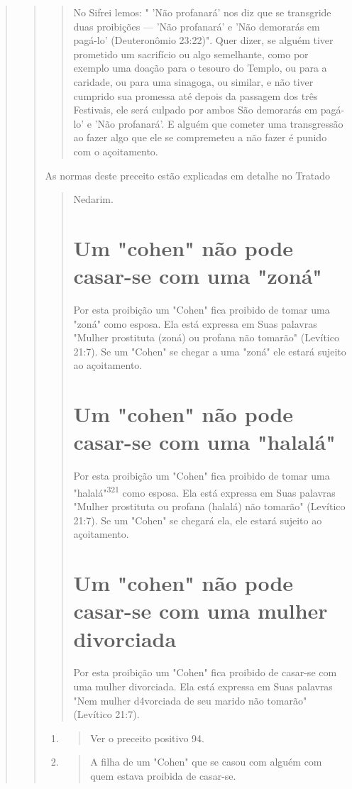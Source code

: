 \begin{quote}
\begin{quote}
\begin{quote}
No Sifrei lemos: " 'Não profanará' nos diz que se transgride duas
proi­bições --- 'Não profanará' e 'Não demorarás em pagá-lo'
(Deuteronômio 23:22)". Quer dizer, se alguém tiver prometido um
sacrifício ou algo semelhante, como por exemplo uma doação para o
tesouro do Templo, ou para a caridade, ou para uma sinagoga, ou similar,
e não tiver cumprido sua promessa até depois da passagem dos três
Festivais, ele será culpado por ambos São demorarás em pagá-lo' e 'Não
profanará'. E alguém que cometer uma transgressão ao fazer al­go que ele
se compremeteu a não fazer é punido com o açoitamento.
\end{quote}

As normas deste preceito estão explicadas em detalhe no Tratado

\begin{quote}
Nedarim.

\section{Um "cohen" não pode casar-se com uma "zoná"}

Por esta proibição um "Cohen" fica proibido de tomar uma "zoná" como
esposa. Ela está expressa em Suas palavras "Mulher prostituta (zoná) ou
profana não tomarão" (Levítico 21:7). Se um "Cohen" se chegar a uma
"zoná" ele estará sujeito ao açoitamento.

\section{Um "cohen" não pode casar-se com uma "halalá"}

Por esta proibição um "Cohen" fica proibido de tomar uma
"hala­lá"\textsuperscript{321} como esposa. Ela está expressa em Suas
palavras "Mulher prostituta ou profana (halalá) não tomarão" (Levítico
21:7). Se um "Cohen" se chegará ela, ele estará sujeito ao açoitamento.

\section{Um "cohen" não pode casar-se com uma mulher divorciada}

Por esta proibição um "Cohen" fica proibido de casar-se com uma mulher
divorciada. Ela está expressa em Suas palavras "Nem mulher d4vorcia­da
de seu marido não tomarão" (Levítico 21:7).
\end{quote}

\begin{enumerate}
\def\labelenumi{\arabic{enumi}.}
\setcounter{enumi}{319}
\item
 \begin{quote}
 Ver o preceito positivo 94.
 \end{quote}
\item
 \begin{quote}
 A filha de um "Cohen" que se casou com alguém com quem estava proibida
 de casar-se.
 \end{quote}
\end{enumerate}


\end{quote}
\end{quote}
